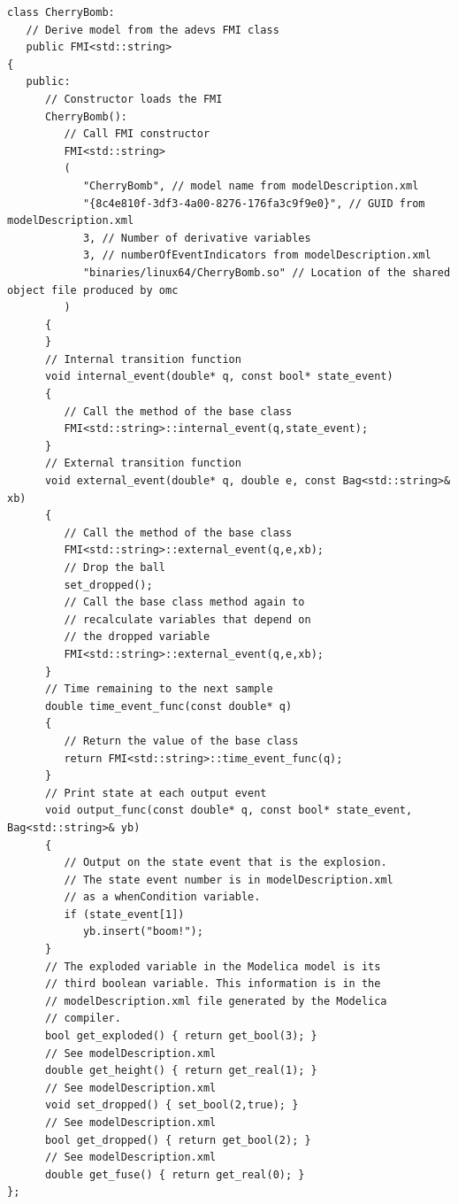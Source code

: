\begin{verbatim}
class CherryBomb:
   // Derive model from the adevs FMI class
   public FMI<std::string>
{
   public:
      // Constructor loads the FMI
      CherryBomb():
         // Call FMI constructor
         FMI<std::string>
         (
            "CherryBomb", // model name from modelDescription.xml
            "{8c4e810f-3df3-4a00-8276-176fa3c9f9e0}", // GUID from modelDescription.xml
            3, // Number of derivative variables
            3, // numberOfEventIndicators from modelDescription.xml
            "binaries/linux64/CherryBomb.so" // Location of the shared object file produced by omc
         )
      {
      }
      // Internal transition function
      void internal_event(double* q, const bool* state_event)
      {
         // Call the method of the base class
         FMI<std::string>::internal_event(q,state_event);
      }
      // External transition function
      void external_event(double* q, double e, const Bag<std::string>& xb)
      {
         // Call the method of the base class
         FMI<std::string>::external_event(q,e,xb);
         // Drop the ball
         set_dropped();
         // Call the base class method again to
         // recalculate variables that depend on
         // the dropped variable
         FMI<std::string>::external_event(q,e,xb);
      }
      // Time remaining to the next sample
      double time_event_func(const double* q)
      {
         // Return the value of the base class
         return FMI<std::string>::time_event_func(q);
      }
      // Print state at each output event
      void output_func(const double* q, const bool* state_event, Bag<std::string>& yb)
      {
         // Output on the state event that is the explosion.
         // The state event number is in modelDescription.xml
         // as a whenCondition variable.
         if (state_event[1])
            yb.insert("boom!");
      }
      // The exploded variable in the Modelica model is its
      // third boolean variable. This information is in the
      // modelDescription.xml file generated by the Modelica
      // compiler.
      bool get_exploded() { return get_bool(3); }
      // See modelDescription.xml
      double get_height() { return get_real(1); }
      // See modelDescription.xml
      void set_dropped() { set_bool(2,true); }
      // See modelDescription.xml
      bool get_dropped() { return get_bool(2); }
      // See modelDescription.xml
      double get_fuse() { return get_real(0); }
};
\end{verbatim}

